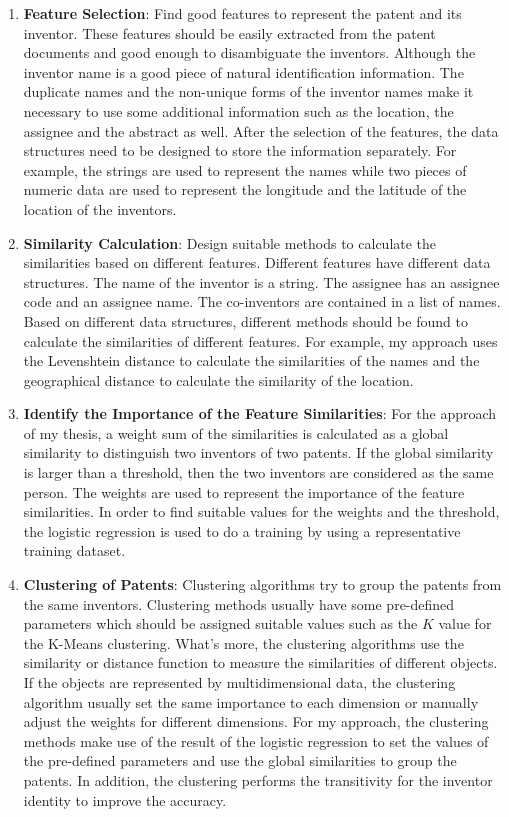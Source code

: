 \begin{enumerate}

\item \textbf{Feature Selection}: Find good features to represent the patent and its inventor. These features should be easily extracted from the patent documents and good enough to disambiguate the inventors. Although the inventor name is a good piece of natural identification information. The duplicate names  and the non-unique forms of the inventor names make it necessary to use some additional information such as the location, the assignee and the abstract  as well. After the selection of the features, the data structures need to be designed to store the information separately. For example, the strings are used to represent the names while two pieces of numeric data are used to represent the longitude and the latitude of the location of the inventors.

\item \textbf{Similarity Calculation}: Design suitable methods to calculate the similarities based on different features.  Different features have different data structures. The name of the inventor is a string. The assignee has an assignee code and an assignee name. The co-inventors are contained in a list of names. Based on different data structures, different methods should be found to calculate the similarities of different features. For example, my approach uses the Levenshtein distance \cite{682181} to calculate the similarities of the names and the geographical distance to calculate the similarity of the location.

\item \textbf{Identify the Importance of the Feature Similarities}: For the approach of my thesis, a weight sum of the similarities is calculated as a global similarity to distinguish two inventors of two patents. If the global similarity is larger than a threshold, then the two inventors are considered as the same person. The weights are used to represent the importance of the feature similarities. In order to find suitable values for the weights and the threshold, the logistic regression is used to do a training by using a representative training dataset.

\item \textbf{Clustering of Patents}: Clustering algorithms try to group the patents from the same inventors.  Clustering methods usually have some pre-defined parameters which should be assigned suitable values such as the $K$ value for the K-Means clustering. What's more, the clustering algorithms use the similarity or distance function to measure the similarities of different objects. If the objects are represented by multidimensional data, the clustering algorithm  usually set the same importance to each dimension or manually adjust the weights for different dimensions. For my approach, the clustering methods make use of the result of the logistic regression to set the values of the pre-defined parameters and use the global similarities to group the patents. In addition, the clustering performs the transitivity for the inventor identity to improve the accuracy. 


\end{enumerate}
